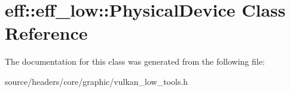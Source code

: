 \hypertarget{classeff_1_1eff__low_1_1PhysicalDevice}{}\section{eff\+:\+:eff\+\_\+low\+:\+:Physical\+Device Class Reference}
\label{classeff_1_1eff__low_1_1PhysicalDevice}


The documentation for this class was generated from the following file\+:\begin{DoxyCompactItemize}
\item 
source/headers/core/graphic/vulkan\+\_\+low\+\_\+tools.\+h\end{DoxyCompactItemize}
